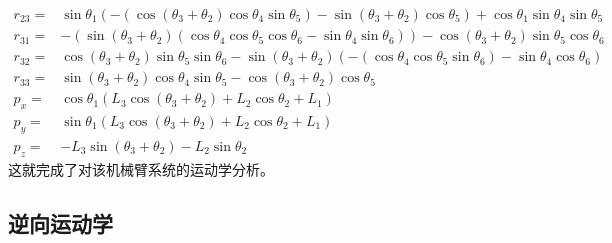 \documentclass{ctexart}
\begin{document}
\[\begin{aligned}
        r_{23} = & \sin\theta_1 \left( -\left( \cos{\left( {{\theta }_3}+{{\theta }_2}\right) } \cos\theta_4 \sin\theta_5\right) -\sin{\left( {{\theta }_3}+{{\theta }_2}\right) } \cos\theta_5\right) +\cos\theta_1 \sin\theta_4 \sin\theta_5 \\
        r_{31} = &  -\left( \sin{\left( {{\theta }_3}+{{\theta }_2}\right) } \left( \cos\theta_4 \cos\theta_5 \cos\theta_6-\sin\theta_4 \sin\theta_6\right) \right) -\cos{\left( {{\theta }_3}+{{\theta }_2}\right) } \sin\theta_5 \cos\theta_6 \\
        r_{32} = & \cos{\left( {{\theta }_3}+{{\theta }_2}\right) } \sin\theta_5 \sin\theta_6-\sin{\left( {{\theta }_3}+{{\theta }_2}\right) } \left( -\left( \cos\theta_4 \cos\theta_5 \sin\theta_6\right) -\sin\theta_4 \cos\theta_6\right) \\
        r_{33} = & \sin{\left( {{\theta }_3}+{{\theta }_2}\right) } \cos\theta_4 \sin\theta_5-\cos{\left( {{\theta }_3}+{{\theta }_2}\right) } \cos\theta_5 \\
        p_x = & \cos{\theta_1} \left( {L_3} \cos{\left( {{\theta }_3}+{{\theta }_2}\right) }+{L_2} \cos{\theta_2}+{L_1}\right) \\
        p_y = & \sin{\theta_1} \left( {L_3} \cos{\left( {{\theta }_3}+{{\theta }_2}\right) }+{L_2} \cos{\theta_2}+{L_1}\right)  \\
        p_z = & -{L_3} \sin{\left( {{\theta }_3}+{{\theta }_2}\right) } -{L_2} \sin{\theta_2}
    \end{aligned}
\]
这就完成了对该机械臂系统的运动学分析。

\subsection{逆向运动学}
\end{document}
